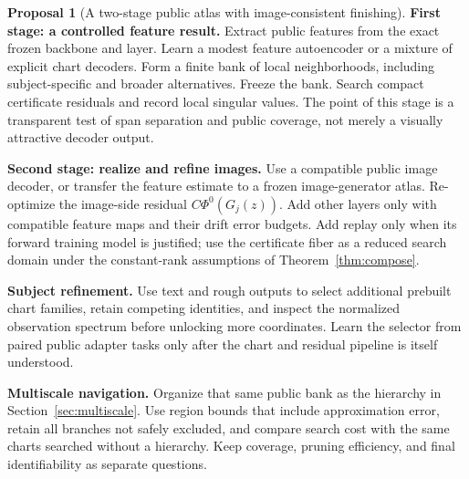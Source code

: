 \documentclass[11pt,a4paper]{article}
\theoremstyle{definition}
\theoremstyle{definition}
\newtheorem{proposal}[theorem]{Proposal}
\theoremstyle{remark}\newtheorem{remark}[theorem]{Remark}
\begin{document}
\begin{proposal}[A two-stage public atlas with image-consistent finishing]\label{pr:programme}
\textbf{First stage: a controlled feature result.} Extract public features from the exact frozen backbone and layer. Learn a modest feature autoencoder or a mixture of explicit chart decoders. Form a finite bank of local neighborhoods, including subject-specific and broader alternatives. Freeze the bank. Search compact certificate residuals and record local singular values. The point of this stage is a transparent test of span separation and public coverage, not merely a visually attractive decoder output.

\textbf{Second stage: realize and refine images.} Use a compatible public image decoder, or transfer the feature estimate to a frozen image-generator atlas. Re-optimize the image-side residual $C\Phi^0(G_j(z))$. Add other layers only with compatible feature maps and their drift error budgets. Add replay only when its forward training model is justified; use the certificate fiber as a reduced search domain under the constant-rank assumptions of Theorem~\ref{thm:compose}.

\textbf{Subject refinement.} Use text and rough outputs to select additional prebuilt chart families, retain competing identities, and inspect the normalized observation spectrum before unlocking more coordinates. Learn the selector from paired public adapter tasks only after the chart and residual pipeline is itself understood.

\textbf{Multiscale navigation.} Organize that same public bank as the hierarchy in Section~\ref{sec:multiscale}. Use region bounds that include approximation error, retain all branches not safely excluded, and compare search cost with the same charts searched without a hierarchy. Keep coverage, pruning efficiency, and final identifiability as separate questions.
\end{proposal}
\end{document}

